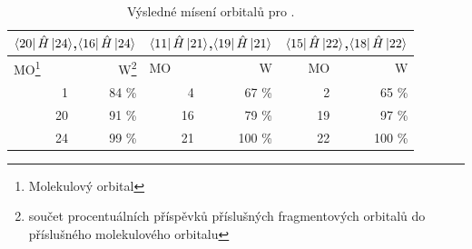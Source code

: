 \documentclass[
  printed, %
  table,   %
  lof,     %
  lot,     %
  oneside,
]{fithesis3}
\begin{document}
\begin{table}[htbp]
\begin{minipage}{\textwidth}
\caption{Výsledné mísení orbitalů pro .}
\begin{center}
\begin{tabular}{|r|r|r|r|r|r|}
\hline 
\multicolumn{2}{|c|}{$\bra{20}{\hat{H}}\ket{24}$,$\bra{16}{\hat{H}}\ket{24}$} & \multicolumn{2}{|c|}{$\bra{11}{\hat{H}}\ket{21}$,$\bra{19}{\hat{H}}\ket{21}$}& \multicolumn{2}{|c|}{$\bra{15}{\hat{H}}\ket{22}$,$\bra{18}{\hat{H}}\ket{22}$} \\
\hline \hline
\multicolumn{1}{|l|}{MO\footnote{Molekulový orbital} } & \multicolumn{1}{r|}{W\footnote{součet procentuálních příspěvků příslušných fragmentových orbitalů do příslušného molekulového orbitalu}} & \multicolumn{1}{l|}{MO} & \multicolumn{1}{r|}{W} & MO & \multicolumn{1}{r|}{W} \\ \hline
1 & 84 \% & 4 & 67 \% & 2 & 65 \% \\ \hline
20 & 91 \% & 16 & 79 \% & 19 &  97 \% \\ \hline
24 & 99 \% & 21 & 100 \% &  22& 100 \% \\ \hline
\end{tabular}
\end{center}
\label{tab_h4sio4_vysledky}
\end{minipage}
\end{table}
    
\end{document}
